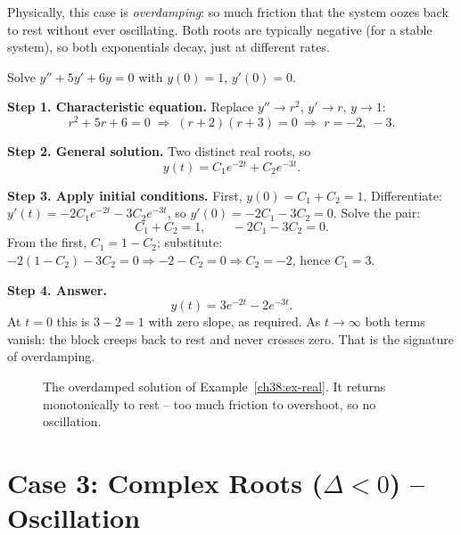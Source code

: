 Physically, this case is \emph{overdamping}: so much friction that the system
oozes back to rest without ever oscillating. Both roots are typically negative
(for a stable system), so both exponentials decay, just at different rates.

\begin{example}
\label{ch38:ex-real}
Solve $y'' + 5y' + 6y = 0$ with $y(0) = 1$, $y'(0) = 0$.

\textbf{Step 1. Characteristic equation.} Replace $y'' \to r^2$, $y' \to r$,
$y \to 1$:
\[
  r^2 + 5r + 6 = 0 \;\Longrightarrow\; (r+2)(r+3) = 0
  \;\Longrightarrow\; r = -2,\ -3.
\]

\textbf{Step 2. General solution.} Two distinct real roots, so
\[
  y(t) = C_1 e^{-2t} + C_2 e^{-3t}.
\]

\textbf{Step 3. Apply initial conditions.} First, $y(0) = C_1 + C_2 = 1$.
Differentiate: $y'(t) = -2 C_1 e^{-2t} - 3 C_2 e^{-3t}$, so $y'(0) = -2C_1 - 3C_2
= 0$. Solve the pair:
\[
  C_1 + C_2 = 1, \qquad -2C_1 - 3C_2 = 0.
\]
From the first, $C_1 = 1 - C_2$; substitute: $-2(1-C_2) - 3C_2 = 0 \Rightarrow
-2 - C_2 = 0 \Rightarrow C_2 = -2$, hence $C_1 = 3$.

\textbf{Step 4. Answer.}
\[
  y(t) = 3 e^{-2t} - 2 e^{-3t}.
\]
At $t=0$ this is $3 - 2 = 1$ with zero slope, as required. As $t \to \infty$ both
terms vanish: the block creeps back to rest and never crosses zero. That is the
signature of overdamping.
\end{example}

\begin{figure}[H]
\centering
{}
\caption{The overdamped solution of Example~\ref{ch38:ex-real}. It returns
monotonically to rest -- too much friction to overshoot, so no oscillation.}
\label{ch38:fig-overdamped}
\end{figure}

\section{Case 3: Complex Roots ($\Delta < 0$) -- Oscillation}
\label{ch38:complex-roots}

